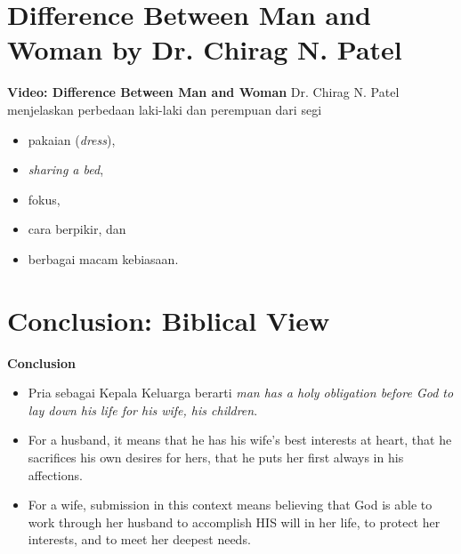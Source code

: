 \documentclass{beamer}
\theoremstyle{mystyle}
\begin{document}
\section{Difference Between Man and Woman by Dr. Chirag N. Patel}
\begin{frame}{\textbf{Video: Difference Between Man and Woman}}
	Dr. Chirag N. Patel menjelaskan perbedaan laki-laki dan perempuan dari segi 
	\begin{itemize}
		\item pakaian (\textit{dress}), 
		\item \textit{sharing a bed}, 
		\item fokus, 
		\item cara berpikir, dan
		\item berbagai macam kebiasaan.
	\end{itemize}			
\end{frame}

\section{Conclusion: Biblical View}
\begin{frame}{\textbf{Conclusion}}
	\begin{itemize}
		\item Pria sebagai Kepala Keluarga berarti \textit{man has a holy obligation before God to lay down his life for his wife, his children}.
		
		\bigskip		
				
		\item For a husband, it means that he has his wife's best interests at heart, that he sacrifices his own desires for hers, that he puts her first always in his affections. 
		
		\bigskip		
		
		\item For a wife, submission in this context means believing that God is able to work through her husband to accomplish HIS will in her life, to protect her interests, and to meet her deepest needs.
	\end{itemize}
\end{frame}

\end{document}
